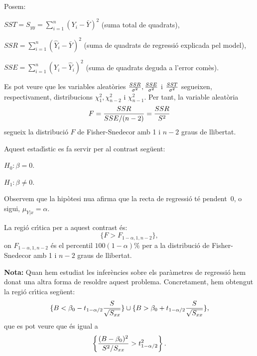Posem:

\begin{description}

\item $SST = S_{yy} = \sum\limits_{i=1}^n (Y_i - \bar{Y})^2$ (suma total de
quadrats),
\item $SSR = \sum\limits_{i=1}^n (\hat{Y}_i - \bar{Y})^2$ (suma de quadrats de
regressi\'o explicada pel model),
\item $SSE = \sum\limits_{i=1}^n (Y_i - \hat{Y}_i)^2$ (suma de quadrats deguda a
l'error com\`es).
\end{description}

Es pot veure que les variables aleat\`ories ${SSR \over \sigma^2}, {SSE \over
\sigma^2}$ i ${SST \over \sigma^2}$ segueixen, respectivament, distribucions
$\chi_1^2, \chi_{n-2}^2$ i $\chi_{n-1}^2$. Per tant, la variable aleat\`oria
$$F = {SSR \over SSE/(n-2)} = {SSR \over S^2}$$
segueix la distribuci\'o $F$ de Fisher-Snedecor amb 1 i $n-2$ graus de llibertat.

Aquest estad\'{\i}stic es fa servir per al contrast seg\"uent:

\begin{description}
\item $H_0 : \beta = 0$.
\item $H_1 : \beta \not = 0$.
\end{description}

Observem que la hip\`otesi nu{\lgem}a 
afirma que la recta de regressi\'o 
t\'e pendent~$0$, o sigui, $\mu_{Y|x} = \alpha$.

La regi\'o cr\'{\i}tica per a aquest contrast \'es:
$$\{ F > F_{1-\alpha,1,n-2} \},$$
on $F_{1-\alpha,1,n-2}$ \'es el percentil $100(1-\alpha) \% $ per a la distribuci\'o
de Fisher-Snedecor amb 1 i $n-2$ graus de llibertat.

{\bf Nota:} Quan hem estudiat les infer\`encies 
sobre els par\`ametres de regressi\'o
hem donat una altra forma de resoldre aquest problema. Concretament, hem obtengut
la regi\'o cr\'{\i}tica seg\"uent:
$$\{ B < \beta_0 - t_{1-\alpha/2} {S \over \sqrt{S_{xx}}} \} \cup \{ B > \beta_0
+ t_{1-\alpha/2} {S \over \sqrt{S_{xx}}} \},$$
que es pot veure que \'es igual a
$$\left\{ {(B - \beta_0)^2 \over S^2/S_{xx}} > t_{1-\alpha/2}^2 \right\}.$$

